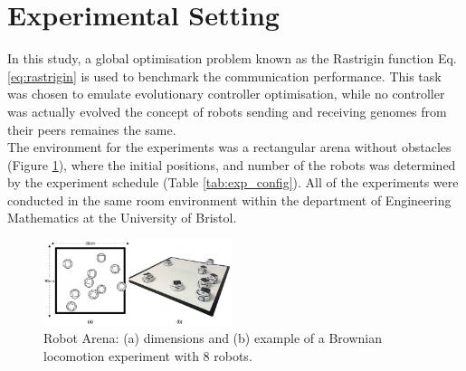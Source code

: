 \documentclass[conference]{IEEEtran}
\begin{document}


\section{Experimental Setting}

In this study, a global optimisation problem known as the Rastrigin function Eq. \ref{eq:rastrigin} is used to benchmark the communication performance. This task was chosen to emulate evolutionary controller optimisation, while no controller was actually evolved the concept of robots sending and receiving genomes from their peers remaines the same.\\ 

The environment for the experiments was a rectangular arena without obstacles (Figure \ref{fig:arena}), where the initial positions, and number of the robots was determined by the experiment schedule (Table \ref{tab:exp_config}). All of the experiments were conducted in the same room environment within the department of Engineering Mathematics at the University of Bristol.

\begin{figure}[H]
    \centering
    \includegraphics[width=0.49\textwidth]{arena.png}
    \caption{Robot Arena: (a) dimensions and (b) example of a Brownian locomotion experiment with 8 robots.}
    \label{fig:arena}
\end{figure}
\end{document}
